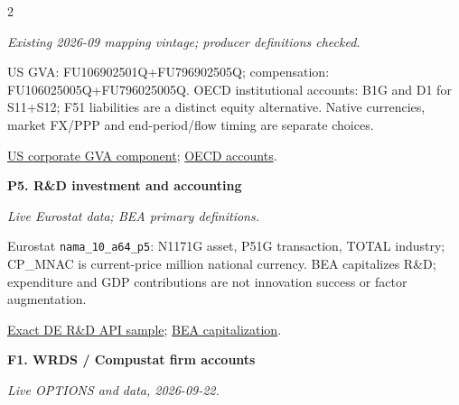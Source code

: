 \documentclass[10pt,a4paper,landscape]{article}
\newcommand{\code}[1]{{\footnotesize\texttt{#1}}}
\begin{document}
\begin{multicols}{2}
\begin{minipage}{\linewidth}
{\footnotesize\itshape Existing 2026-09 mapping vintage; producer definitions checked.}\par

US GVA: FU106902501Q+FU796902505Q; compensation: FU106025005Q+FU796025005Q. OECD institutional accounts: B1G and D1 for S11+S12; F51 liabilities are a distinct equity alternative. Native currencies, market FX/PPP and end-period/flow timing are separate choices.

\par \href{https://fred.stlouisfed.org/series/BOGZ1FU106902501Q}{US corporate GVA component}; \href{https://www.oecd.org/en/publications/national-accounts-of-oecd-countries_2221433x.html}{OECD accounts}.

\end{minipage}\par\vspace{6pt}

\noindent\begin{minipage}{\linewidth}\raggedright

\hypertarget{src-P5}{\textbf{P5. R\&D investment and accounting}}\par

{\footnotesize\itshape Live Eurostat data; BEA primary definitions.}\par

Eurostat \code{nama\_10\_a64\_p5}: N1171G asset, P51G transaction, TOTAL industry; CP\_MNAC is current-price million national currency. BEA capitalizes R\&D; expenditure and GDP contributions are not innovation success or factor augmentation.

\par \href{https://ec.europa.eu/eurostat/api/dissemination/statistics/1.0/data/nama_10_a64_p5?geo=DE&freq=A&nace_r2=TOTAL&asset10=N1171G&na_item=P51G&unit=CP_MNAC&sinceTimePeriod=2021&untilTimePeriod=2023}{Exact DE R\&D API sample}; \href{https://www.bea.gov/help/faq/1028}{BEA capitalization}.

\end{minipage}\par\vspace{6pt}

\noindent\begin{minipage}{\linewidth}\raggedright

\hypertarget{src-F1}{\textbf{F1. WRDS / Compustat firm accounts}}\par

{\footnotesize\itshape Live OPTIONS and data, 2026-09-22.}\par


\end{minipage}
\end{multicols}
\end{document}
